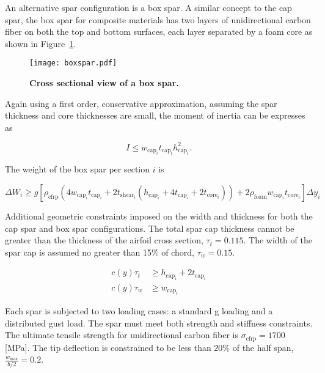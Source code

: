 \documentclass[]{aiaa-tc}%
\begin{document}
An alternative spar configuration is a box spar.  
A similar concept to the cap spar, the box spar for composite materials has two layers of unidirectional carbon fiber on both the top and bottom surfaces, each layer separated by a foam core as shown in Figure~\ref{f:boxspar}.

\begin{figure}[h!]
	\begin{center}
	\texttt{[image: boxspar.pdf]}
    \caption{\textbf{Cross sectional view of a box spar.}}
	\label{f:boxspar}
	\end{center}
\end{figure}

Again using a first order, conservative approximation, assuming the spar thickness and core thicknesses are small, the moment of inertia can be expresses as

\begin{equation}
    \label{e:moispar}
    I \leq w_{\text{cap}_i}t_{\text{cap}_i}h_{\text{cap}_i}^2.
\end{equation}

The weight of the box spar per section $i$ is 

\begin{equation}
    \label{e:sparmass}
    \Delta W_i \geq g [\rho_{\text{cfrp}} (4w_{\text{cap}_i}t_{\text{cap}_i} + 2t_{\mathrm{shear}_i}(h_{\mathrm{cap}_i} + 4t_{\mathrm{cap}_i} + 2t_{\mathrm{core}_i})) + 2\rho_{\mathrm{foam}} w_{\mathrm{cap}_i}t_{\mathrm{core}_i}] \Delta y_i
\end{equation}

Additional geometric constraints imposed on the width and thickness for both the cap spar and box spar configurations.  
The total spar cap thickness cannot be greater than the thickness of the airfoil cross section, $\tau_t = 0.115$.  
The width of the spar cap is assumed no greater than 15\% of chord, $\tau_w = 0.15$. 

\begin{align}
    c(y)\tau_t &\geq h_{\text{cap}_i} + 2t_{\text{cap}_i} \\
    c(y)\tau_w &\geq w_{\text{cap}_i} 
\end{align}

Each spar is subjected to two loading cases: a standard g loading and a distributed gust load.  The spar must meet both strength and stiffness constraints.
The ultimate tensile strength for unidirectional carbon fiber is $\sigma_{\text{cfrp}} = 1700$ [MPa].\cite{cfprop}
The tip deflection is constrained to be less than 20\% of the half span, $\frac{w_{\text{max}}}{b/2} = 0.2$.
\end{document}
